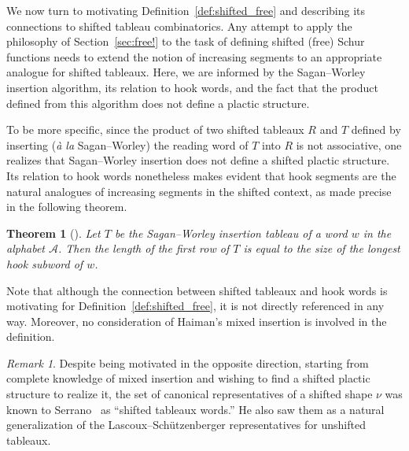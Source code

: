 \documentclass[12 pt]{amsart}
\newcommand{\cA}{\mathcal{A}}
\newtheorem{theorem}[thm]{Theorem}
\theoremstyle{remark}
\newtheorem{remark}[thm]{Remark}
\numberwithin{equation}{section}
\begin{document}
We now turn to motivating Definition~\ref{def:shifted_free} and describing its connections to shifted tableau combinatorics.    
Any attempt to apply the philosophy of Section~\ref{sec:free!} to the task of defining  shifted (free) Schur functions needs to extend the notion of increasing segments to an appropriate analogue for shifted tableaux. Here, we are informed by the Sagan--Worley insertion algorithm, its relation to hook words, and the fact that the product defined from this algorithm does not define a plactic structure. 

To be more specific, since the product of two shifted tableaux $R$ and $T$ defined by inserting ({\it \`{a} la} Sagan--Worley) the reading word of $T$ into $R$ is not associative, one realizes that Sagan--Worley insertion does not define a shifted plactic structure. Its relation to hook words nonetheless makes evident that hook segments are the natural analogues of increasing segments in the shifted context, as made precise in the following theorem. 

\begin{theorem}[\cite{Worley,Sagan}]\label{thm:Sagan_Hook} 
    Let $T$ be the Sagan--Worley insertion tableau of a word $w$ in the alphabet $\cA$. Then the length of the first row of $T$ is equal to the size of the longest hook subword of $w$.
\end{theorem}



Note that although the connection between shifted tableaux and hook words is motivating for Definition~\ref{def:shifted_free}, it is not directly referenced in any way. Moreover, no consideration of Haiman's mixed insertion is involved in the definition. 



\begin{remark}
    Despite being motivated in the opposite direction, starting from complete knowledge of mixed insertion and wishing to find a shifted plactic structure to realize it, the set of canonical representatives of a shifted shape $\nu$ was known to Serrano~\cite{Serrano} as ``shifted tableaux words.'' He also saw them as a natural generalization of the Lascoux--Sch\"{u}tzenberger representatives for unshifted tableaux.
\end{remark}
\end{document}
